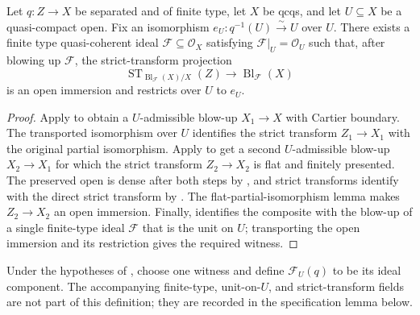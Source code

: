 \begin{lemma}
  \label{lemma:nagata-flattening-ideal-exists}

  Let $q\colon Z\to X$ be separated and of finite type, let $X$ be qcqs,
  and let $U\subseteq X$ be a quasi-compact open.  Fix an isomorphism
  $e_U\colon q^{-1}(U)\xrightarrow{\sim}U$ over $U$.  There exists a finite type
  quasi-coherent ideal $\mathcal F\subseteq\mathcal O_X$ satisfying
  $\mathcal F|_U=\mathcal O_U$ such that, after blowing up $\mathcal F$, the
  strict-transform projection
  \[
    \operatorname{ST}_{\operatorname{Bl}_{\mathcal F}(X)/X}(Z)
      \longrightarrow \operatorname{Bl}_{\mathcal F}(X)
  \]
  is an open immersion and restricts over $U$ to $e_U$.
\end{lemma}

\begin{proof}
  Apply  to obtain a
  $U$-admissible blow-up $X_1\to X$ with Cartier boundary.  The transported
  isomorphism over $U$ identifies the strict transform $Z_1\to X_1$ with the
  original partial isomorphism.  Apply
   to get a second
  $U$-admissible blow-up $X_2\to X_1$ for which the strict transform
  $Z_2\to X_2$ is flat and finitely presented.  The preserved open is dense
  after both steps by
  , and strict
  transforms identify with the direct strict transform by
  .  The flat-partial-isomorphism
  lemma makes $Z_2\to X_2$ an open immersion.  Finally,
   identifies the composite with the
  blow-up of a single finite-type ideal $\mathcal F$ that is the unit on $U$;
  transporting the open immersion and its restriction gives the required
  witness.
\end{proof}

\begin{definition}
  \label{def:nagata-flattening-ideal}

  Under the hypotheses of
  , choose one witness and define
  $\mathcal F_U(q)$ to be its ideal component.  The accompanying finite-type,
  unit-on-$U$, and strict-transform fields are not part of this definition;
  they are recorded in the specification lemma below.
\end{definition}

